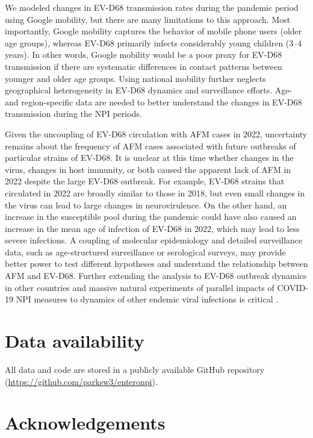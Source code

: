 \documentclass[12pt]{article}
\begin{document}
We modeled changes in EV-D68 transmission rates during the pandemic period using Google mobility, but there are many limitations to this approach.
Most importantly, Google mobility captures the behavior of mobile phone users (older age groups), whereas EV-D68 primarily infects considerably young children (3--4 years).
In other words, Google mobility would be a poor proxy for EV-D68 transmission if there are systematic differences in contact patterns between younger and older age groups.
Using national mobility further neglects geographical heterogeneity in EV-D68 dynamics and surveillance efforts.
Age- and region-specific data are needed to better understand the changes in EV-D68 transmission during the NPI periods.

Given the uncoupling of EV-D68 circulation with AFM cases in 2022, uncertainty remains about the frequency of AFM cases associated with future outbreaks of particular strains of EV-D68.
It is unclear at this time whether changes in the virus, changes in host immunity, or both caused the apparent lack of AFM in 2022 despite the large EV-D68 outbreak.
For example, EV-D68 strains that circulated in 2022 are broadly similar to those in 2018, but even small changes in the virus can lead to large changes in neurovirulence.
On the other hand, an increase in the susceptible pool during the pandemic could have also caused an increase in the mean age of infection of EV-D68 in 2022, which may lead to less severe infections.
A coupling of molecular epidemiology and detailed surveillance data, such as age-structured surveillance or serological surveys, may provide better power to test different hypotheses and understand the relationship between AFM and EV-D68.
Further extending the analysis to EV-D68 outbreak dynamics in other countries and massive natural experiments of parallel impacts of COVID-19 NPI measures to dynamics of other endemic viral infections is critical \citep{baker2020impact}.

\section*{Data availability}

All data and code are stored in a publicly available GitHub repository (\url{https://github.com/parksw3/enteronpi}).


\section*{Acknowledgements}
\end{document}
